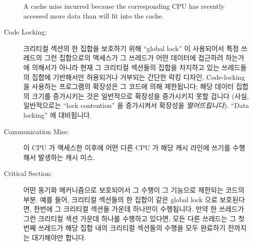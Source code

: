 \begin{description}
	A cache miss incurred because the corresponding CPU has recently
	accessed more data than will fit into the cache.
	\fi
\item[Code Locking:]
	크리티컬 섹션의 한 집합을 보호하기 위해 ``global lock'' 이 사용되어서
	특정 쓰레드의 그런 집합으로의 액세스가 그 쓰레드가 어떤 데이터에
	접근하려 하는가에 의해서가 아니라 현재 그 크리티컬 섹션들의 집합을
	차지하고 있는 쓰레드들의 집합에 기반해서만 허용되거나 거부되는 간단한
	락킹 디자인.
	Code-locking 을 사용하는 프로그램의 확장성은 그 코드에 의해 제한됩니다;
	해당 데이터 집합의 크기를 증가시키는 것은 일반적으로 확장성을
	증가시키지 못할 겁니다 (사실, 일반적으로는 ``lock contention'' 을
	증가시켜서 확장성을 \emph{떨어뜨립니다}).
	``Data locking'' 에 대비됩니다.
	\iffalse

	A simple locking design in which a ``global lock'' is used to protect
	a set of critical sections, so that access by a given thread
	to that set is
	granted or denied based only on the set of threads currently
	occupying the set of critical sections, not based on what
	data the thread intends to access.
	The scalability of a code-locked program is limited by the code;
	increasing the size of the data set will normally not increase
	scalability (in fact, will typically \emph{decrease} scalability
	by increasing ``lock contention'').
	Contrast with ``data locking''.
	\fi
\item[Communication Miss:]
	이 CPU 가 액세스한 이후에 어떤 다른 CPU 가 해당 캐시 라인에 쓰기를
	수행해서 발생하는 캐시 미스.
	\iffalse

	A cache miss incurred because the some other CPU has written to
	the cache line since the last time this CPU accessed it.
	\fi
\item[Critical Section:]
	어떤 동기화 메커니즘으로 보호되어서 그 수행이 그 기능으로 제한되는
	코드의 부분.
	예를 들어, 크리티컬 섹션들의 한 집합이 같은 global lock 으로
	보호된다면, 한번에 그 크리티컬 섹션들 가운데 하나만이 수행됩니다.
	만약 한 쓰레드가 그런 크리티컬 섹션 가운데 하나를 수행하고 있다면, 모든
	다른 쓰레드는 그 첫번째 쓰레드가 해당 집합 내의 크리티컬 섹션들의
	수행을 모두 완료하기 전까지는 대기해야만 합니다.
	\iffalse


\end{description}
